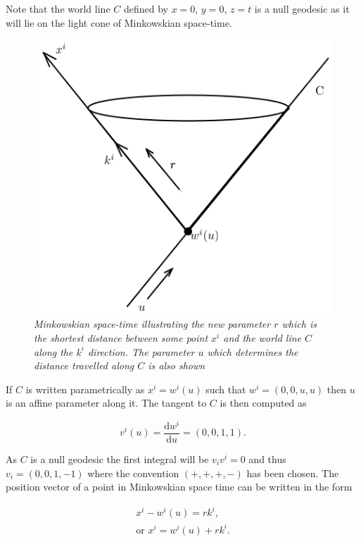 \noindent Note that the world line $C$ defined by $x = 0$, $y = 0$, $z = t$ is a null geodesic as it will lie on the light cone of Minkowskian space-time. 

\begin{figure}[h!]
\begin{center}
\caption{\textit{Minkowskian space-time illustrating the new parameter $r$ which is the shortest distance between some point $x^i$ and the world line $C$ along the $k^i$ direction. The parameter $u$ which determines the distance travelled along $C$ is also shown}}
\label{Reparameterization_Figure_Unit_Vector}
\includegraphics[scale=0.8]{figs/2_1.png}
\end{center}
\end{figure}

\noindent If $C$ is written parametrically as $x^i = w^i (u)$ such that $w^i = (0,0,u,u)$ then $u$ is an affine parameter along it. The tangent to $C$ is then computed as

\begin{equation*} 
v^i (u) = \frac{\mathrm{d} w^i}{\mathrm{d}u} = (0,0,1,1).
\end{equation*} 

\noindent As $C$ is a null geodesic the first integral will be $v_i v^i = 0$ and thus $v_i = (0,0,1,-1)$ where the convention $(+,+,+,-)$ has been chosen. The position vector of a point in Minkowskian space time can be written in the form

\begin{eqnarray*}
x^i - w^i (u) = r k^i, \\
\text{or } x^i = w^i(u) + r k^i. 
\end{eqnarray*}

